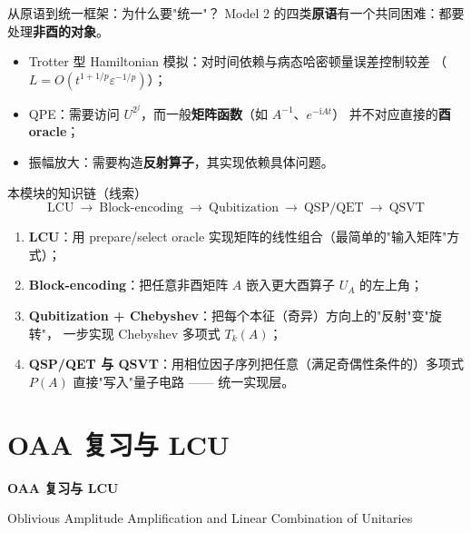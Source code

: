\documentclass[aspectratio=169,9pt]{ctexbeamer}
\newcommand{\eps}{\varepsilon}
\newcommand{\ii}{\mathrm{i}}
\newcommand{\smallcite}[1]{\par\vspace{1.2mm}{\scriptsize\color{graytext}#1}}
\begin{document}
\begin{frame}{从原语到统一框架：为什么要"统一"？}
Model 2 的四类\textbf{原语}有一个共同困难：都要处理\textbf{非酉的对象}。
\begin{itemize}
\item Trotter 型 Hamiltonian 模拟：对时间依赖与病态哈密顿量误差控制较差
（$L=O(t^{1+1/p}\eps^{-1/p})$）；
\item QPE：需要访问 $U^{2^j}$，而一般\textbf{矩阵函数}（如 $A^{-1}$、$e^{-\ii At}$）
并不对应直接的\textbf{酉 oracle}；
\item 振幅放大：需要构造\textbf{反射算子}，其实现依赖具体问题。
\end{itemize}
\begin{keybox}{本模块的知识链（线索）}
\[
\boxed{\ \text{LCU}\ \to\ \text{Block-encoding}\ \to\ \text{Qubitization}\ \to\ \text{QSP/QET}\ \to\ \text{QSVT}\ }
\]
\begin{enumerate}
\item \textbf{LCU}：用 prepare/select oracle 实现矩阵的线性组合（最简单的"输入矩阵"方式）；
\item \textbf{Block-encoding}：把任意非酉矩阵 $A$ 嵌入更大酉算子 $U_A$ 的左上角；
\item \textbf{Qubitization + Chebyshev}：把每个本征（奇异）方向上的"反射"变"旋转"，
一步实现 Chebyshev 多项式 $T_k(A)$；
\item \textbf{QSP/QET 与 QSVT}：用相位因子序列把任意（满足奇偶性条件的）多项式 $P(A)$
直接"写入"量子电路 —— 统一实现层。
\end{enumerate}
\end{keybox}
\smallcite{Model 3 笔记第 1 节。}
\end{frame}

\section{OAA 复习与 LCU}
\begin{frame}[plain]
\centering\vspace{2.0cm}
{\Huge\bfseries\color{navy} OAA 复习与 LCU}\par\vspace{4mm}
{\large Oblivious Amplitude Amplification and Linear Combination of Unitaries}
\end{frame}
\end{document}
